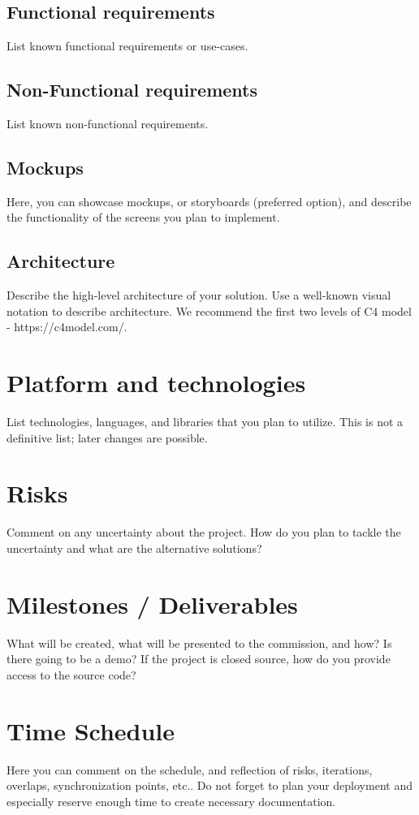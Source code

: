 \documentclass{article}
\begin{document}
\subsection{Functional requirements}
List known functional requirements or use-cases.

\subsection{Non-Functional requirements}
List known non-functional requirements.

\subsection{Mockups}
Here, you can showcase mockups, or storyboards (preferred option), and describe the functionality of the screens you plan to implement.

\subsection{Architecture}
Describe the high-level architecture of your solution.
Use a well-known visual notation to describe architecture.
We recommend the first two levels of C4 model - https://c4model.com/.

\section{Platform and technologies}
List technologies, languages, and libraries that you plan to utilize.
This is not a definitive list; later changes are possible.

\section{Risks}
Comment on any uncertainty about the project.
How do you plan to tackle the uncertainty and what are the alternative solutions?

\section{Milestones / Deliverables}
What will be created, what will be presented to the commission, and how?
Is there going to be a demo?
If the project is closed source, how do you provide access to the source code?

\section{Time Schedule}
Here you can comment on the schedule, and reflection of risks, iterations, overlaps, synchronization points, etc..
Do not forget to plan your deployment and especially reserve enough time to create necessary documentation.
\end{document}
